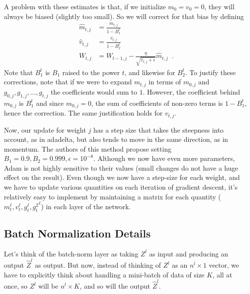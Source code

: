 A problem with these estimates is that, if we initialize $m_0 = v_0 = 0$,
they will always be biased (slightly too small).  So we will correct
for that bias  by defining
\begin{align*}
  \hat{m}_{t,j} & = \frac{m_{t,j}}{1 - B^t_1}                     \\
  \hat{v}_{t,j} & = \frac{v_{t,j}}{1 - B^t_2}                     \\
  W_{t,j}       & = W_{t-1,j} - \frac{\eta}{\sqrt{\hat{v}_{t,j} +
      \epsilon}}\hat{m}_{t,j} \;\;.
\end{align*}
Note that $B^t_1$ is $B_1$ raised to the power $t$, and likewise for
$B^t_2$.  To justify these corrections, note that if we were to expand $m_{t,j}$
in terms of $m_{0,j}$ and $g_{0,j}, g_{1,j}, \dots, g_{t,j}$ the coefficients would
sum to $1$.  However, the coefficient behind $m_{0,j}$ is $B_1^t$ and since
$m_{0,j} = 0$, the sum of coefficients of non-zero terms is $1 - B_1^t$, hence
the correction.  The same justification holds for $v_{t,j}$.

Now, our update for weight $j$ has a step size that takes the
steepness into account, as in adadelta, but also tends to move in the
same direction, as in momentum.  The authors of this method propose
setting $B_1 = 0.9, B_2 = 0.999, \epsilon = 10^{-8}$.  Although we now
have even more parameters, Adam is not highly sensitive to their values
(small changes do not have a huge effect on the result).
Even though we now have a step-size for each weight, and we have to
update various quantities on each iteration of gradient descent, it's
relatively easy to implement by maintaining a matrix for each quantity
($ m^{\ell}_t, v^{\ell}_t, g^{\ell}_t, {g^{2}_t}^{\ell} $) in each
layer of the network.





% 

\subsection{Batch Normalization Details}\label{batch-norm-appendix}

Let's think of the batch-norm layer as taking $Z^l$ as input and
producing an output $\widehat{Z}^l$ as output.  But now, instead of
thinking of $Z^l$ as an $n^l \times 1$ vector, we have to explicitly
think about handling a mini-batch of data of size $K$, all at once, so
$Z^l$ will be $n^l \times K$, and so will the output $\widehat{Z}^l$.

